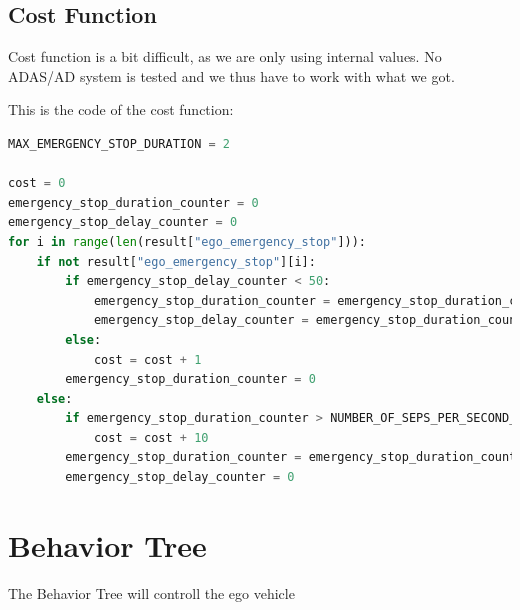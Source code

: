 \subsection{Cost Function}
Cost function is a bit difficult, as we are only using internal values. No ADAS/AD system is tested and we thus have to work with what we got.

This is the code of the cost function:

\begin{lstlisting}[language=Python]
MAX_EMERGENCY_STOP_DURATION = 2

cost = 0
emergency_stop_duration_counter = 0
emergency_stop_delay_counter = 0
for i in range(len(result["ego_emergency_stop"])):
	if not result["ego_emergency_stop"][i]:
		if emergency_stop_delay_counter < 50:
			emergency_stop_duration_counter = emergency_stop_duration_counter + 1
			emergency_stop_delay_counter = emergency_stop_duration_counter + 1
		else:
			cost = cost + 1
		emergency_stop_duration_counter = 0
	else:
		if emergency_stop_duration_counter > NUMBER_OF_SEPS_PER_SECOND_ * MAX_EMERGENCY_STOP_DURATION:
			cost = cost + 10
		emergency_stop_duration_counter = emergency_stop_duration_counter + 1
		emergency_stop_delay_counter = 0

\end{lstlisting}



\section{Behavior Tree}
The Behavior Tree will controll the ego vehicle 

